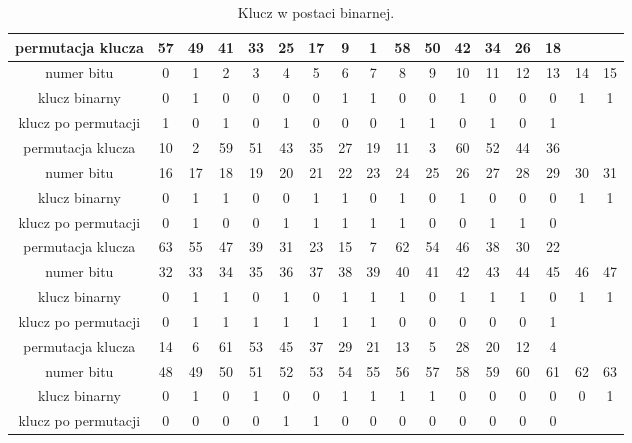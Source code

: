 \documentclass[12p]{article}
\begin{document}
\begin{table}[H]
\centering
\begin{tabular}{|c|c|c|c|c|c|c|c|c|c|c|c|c|c|c|c|c|}
\hline
permutacja klucza & 57 & 49 & 41 & 33 & 25 & 17 & 9 & 1 & 58 & 50 & 42 & 34 & 26 & 18 & &\\
\hline
numer bitu & 0 & 1 & 2 & 3 & 4 & 5 & 6 & 7 & 8 & 9 & 10 & 11 & 12 & 13 & 14 & 15\\
\hline
klucz binarny & 0 & 1 & 0 & 0 & 0 & 0 & 1 & 1 & 0 & 0 & 1 & 0 & 0 & 0 & 1 & 1\\
\hline
klucz po permutacji & 1 & 0 & 1 & 0 & 1 & 0 & 0 & 0 & 1 & 1 & 0 & 1 & 0 & 1 &&\\

\hline
\hline
permutacja klucza & 10 & 2 & 59 & 51 & 43 & 35 & 27 & 19 & 11 & 3 & 60 & 52 & 44 & 36 &&\\
\hline
numer bitu & 16 & 17 & 18 & 19 & 20 & 21 & 22 & 23 & 24 & 25 & 26 & 27 & 28 & 29 & 30 & 31\\
\hline
klucz binarny & 0 & 1 & 1 & 0 & 0 & 1 & 1 & 0 & 1 & 0 & 1 & 0 & 0 & 0 & 1 & 1\\
\hline 
klucz po permutacji & 0 & 1 & 0 & 0 & 1 & 1 & 1 & 1 & 1 & 0 & 0 & 1 & 1 & 0 &&\\

\hline
\hline
permutacja klucza & 63 & 55 & 47 & 39 & 31 & 23 & 15 & 7 & 62 & 54 & 46 & 38 & 30 & 22 &&\\
\hline
numer bitu & 32 & 33 & 34 & 35 & 36 & 37 & 38 & 39 & 40 & 41 & 42 & 43 & 44 & 45 & 46 & 47 \\
\hline
klucz binarny & 0 & 1 & 1 & 0 & 1 & 0 & 1 & 1 & 1 & 0 & 1 & 1 & 1 & 0 & 1 & 1 \\
\hline
klucz po permutacji & 0 & 1 & 1 & 1 & 1 & 1 & 1 & 1 & 0 & 0 & 0 & 0 & 0 & 1 &&\\

\hline
\hline
permutacja klucza & 14 & 6 & 61 & 53 & 45 & 37 & 29 & 21 & 13 & 5 & 28 & 20 & 12 & 4 &&\\
\hline
numer bitu & 48 & 49 & 50 & 51 & 52 & 53 & 54 & 55 & 56 & 57 & 58 & 59 & 60 & 61 & 62 & 63\\
\hline
klucz binarny & 0 & 1 & 0 & 1 & 0 & 0 & 1 & 1 & 1 & 1 & 0 & 0 & 0 & 0 & 0 & 1\\
\hline 
klucz po permutacji & 0 & 0 & 0 & 0 & 1 & 1 & 0 & 0 & 0 & 0 & 0 & 0 & 0 & 0 &&\\
\hline
\end{tabular}
\caption{Klucz w postaci binarnej.}~\label{tabela_podstawienia}
\end{table}
\end{document}
